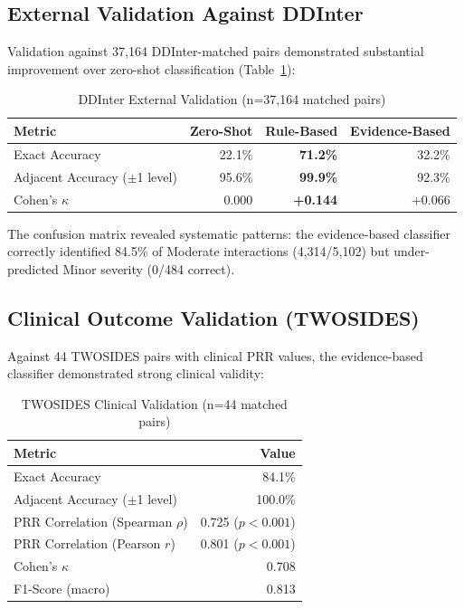 \documentclass[11pt,a4paper]{article}
\begin{document}
\subsection*{External Validation Against DDInter}

Validation against 37,164 DDInter-matched pairs demonstrated substantial improvement over zero-shot classification (Table~\ref{tab:ddinter}):

\begin{table}[h]
\centering
\small
\caption{DDInter External Validation (n=37,164 matched pairs)}
\label{tab:ddinter}
\begin{tabular}{@{}lrrr@{}}
\toprule
\textbf{Metric} & \textbf{Zero-Shot} & \textbf{Rule-Based} & \textbf{Evidence-Based} \\
\midrule
Exact Accuracy & 22.1\% & \textbf{71.2\%} & 32.2\% \\
Adjacent Accuracy ($\pm$1 level) & 95.6\% & \textbf{99.9\%} & 92.3\% \\
Cohen's $\kappa$ & 0.000 & \textbf{+0.144} & +0.066 \\
\bottomrule
\end{tabular}
\end{table}

The confusion matrix revealed systematic patterns: the evidence-based classifier correctly identified 84.5\% of Moderate interactions (4,314/5,102) but under-predicted Minor severity (0/484 correct).

\subsection*{Clinical Outcome Validation (TWOSIDES)}

Against 44 TWOSIDES pairs with clinical PRR values, the evidence-based classifier demonstrated strong clinical validity:

\begin{table}[h]
\centering
\small
\caption{TWOSIDES Clinical Validation (n=44 matched pairs)}
\label{tab:twosides}
\begin{tabular}{@{}lr@{}}
\toprule
\textbf{Metric} & \textbf{Value} \\
\midrule
Exact Accuracy & 84.1\% \\
Adjacent Accuracy ($\pm$1 level) & 100.0\% \\
PRR Correlation (Spearman $\rho$) & 0.725 ($p < 0.001$) \\
PRR Correlation (Pearson $r$) & 0.801 ($p < 0.001$) \\
Cohen's $\kappa$ & 0.708 \\
F1-Score (macro) & 0.813 \\
\bottomrule
\end{tabular}
\end{table}
\end{document}
